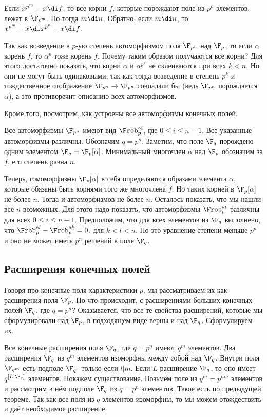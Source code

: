 Если $x^{p^m}-x \di f$, то все корни $f$, которые порождают поле из $p^n$ элементов, лежат в $\F_{p^m}$. Но тогда $m \di n$. Обратно, если $m\di n$, то $x^{p^m}-x\di x^{p^n}-x\di f$.

Так как возведение в $p$-ую степень автоморфизмом поля $\F_{p^n}$ над $\F_p$, то если $\alpha$ корень $f$, то $\alpha^p$ тоже корень $f$. Почему таким образом получаются все корни? Для этого достаточно показать, что корни $\alpha$ и $\alpha^{p^k}$ не склеиваются при всех $k<n$. Но они не могут быть одинаковыми, так как тогда возведение в степень $p^k$ и тождественное отображение $\F_{p^n} \to \F_{p^n}$ совпадали бы (ведь $\F_{p^n}$ порождается $\alpha$), а это противоречит описанию всех автоморфизмов.
\endproof


Кроме того, посмотрим, как устроены все автоморфизмы конечных полей.

\utv Все автоморфизмы $\F_{p^n}$  имеют вид $\Frob_p^{\circ i}$, где $0\leq i \leq n-1$. Все указанные автоморфизмы различны.
\proof Обозначим $q=p^n$. Заметим, что поле $\F_q$ порождено одним элементом $\F_q =\F_p[\alpha]$. Минимальный многочлен $\alpha$ над $\F_p$ обозначим за $f$, его степень равна $n$. 

Теперь, гомоморфизмы $\F_p[\alpha]$ в себя определяются образами элемента $\alpha$, которые обязаны быть корнями того же многочлена $f$. Но таких корней в $\F_p[\alpha]$ не более $n$. Тогда и автоморфизмов не более $n$. Осталось показать, что мы нашли все $n$ возможных. Для этого надо показать, что автоморфизмы $\Frob_p^{\circ i}$ различны для всех $0\leq i\leq n-1$. Предположим, что для всех элементов из $\F_q$ выполнено, что $\Frob_p^{\circ l} - \Frob_p^{\circ k}=0$, для $k<l<n$. Но это уравнение степени меньше $p^n$ и оно не может иметь $p^n$ решений в поле $\F_q$. 
\endproof
 
\eutv


\subsection{Расширения конечных полей}

Говоря про конечные поля характеристики $p$, мы рассматриваем их как расширения поля $\F_p$. Но что происходит, с расширениями больших конечных полей $\F_q$, где $q=p^n$? Оказывается, что все те свойства расширений, которые мы сформулировали над $\F_p$, в  подходящем виде верны и над $\F_q$. Сформулируем их. 



\thrm Все конечные расширения поля $\F_q$, где $q=p^n$ имеют $q^m$ элементов. Два расширения $\F_q$ из $q^m$ элементов изоморфны между собой над $\F_q$. Внутри поля $\F_{q^m}$ есть подполе $\F_{q^l}$ только если $l|m$.
\proof
Если $L$ расширение $\F_q$, то оно имеет $q^{[L:\F_q]}$ элементов. Покажем существование. Возьмём поле из $q^m=p^{nm}$ элементов и рассмотрим в нём подполе $\F_q$ из $q=p^n$ элементов. Такое есть по предыдущей теореме. Так как все поля из $q$ элементов изоморфны, то мы можем отождествить  и даёт необходимое расширение. 

